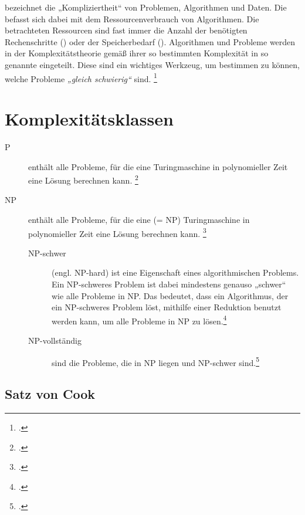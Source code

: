 \documentclass{lehramt-informatik-haupt}
\begin{document}
 bezeichnet die „Kompliziertheit“ von Problemen,
Algorithmen und Daten.
%
Die  befasst sich dabei mit dem
Ressourcenverbrauch von Algorithmen.
%
Die betrachteten Ressourcen sind fast immer die Anzahl der
benötigten Rechenschritte () oder der
Speicherbedarf ().
%
Algorithmen und Probleme werden in der Komplexitätstheorie gemäß ihrer
so bestimmten Komplexität in so genannte 
eingeteilt. Diese sind ein wichtiges Werkzeug, um bestimmen zu können,
welche Probleme \emph{„gleich schwierig“} sind.
\footcite[Seite 58]{theo:fs:4}

\section{Komplexitätsklassen}

\begin{description}
\item[P]
enthält alle Probleme, für die eine 
Turingmaschine in polynomieller Zeit eine Lösung berechnen kann.
\footcite[Seite 59]{theo:fs:4}

\item[NP]
enthält alle Probleme, für die eine  (= NP)
Turingmaschine in polynomieller Zeit eine Lösung berechnen kann.
\footcite[Seite 60]{theo:fs:4}

\begin{description}
\item[NP-schwer] (engl. NP-hard) ist eine Eigenschaft eines
algorithmischen Problems. Ein NP-schweres Problem ist dabei mindestens
genauso „schwer“ wie alle Probleme in NP. Das bedeutet, dass ein
Algorithmus, der ein NP-schweres Problem löst, mithilfe einer Reduktion
benutzt werden kann, um alle Probleme in NP zu lösen.\footcite{wiki:np-schwer}

\item[NP-vollständig] sind die Probleme, die in NP liegen
und NP-schwer sind.\footcite{wiki:np-vollstaendig}
\end{description}
\end{description}

%

\subsection{Satz von Cook}
\end{document}
